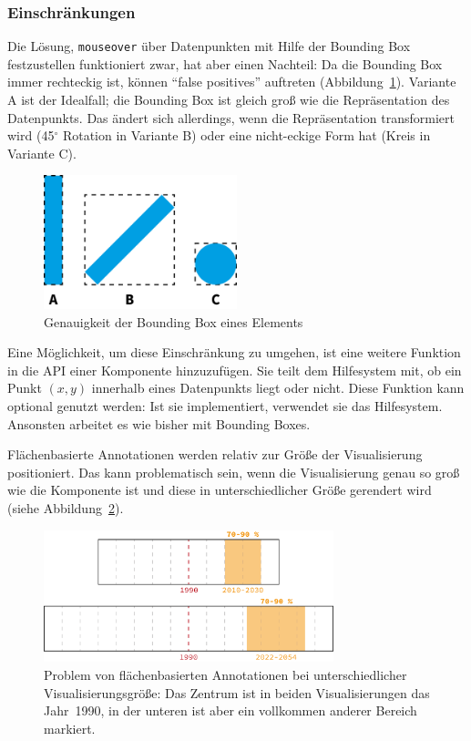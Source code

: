 \documentclass[
	headsepline,
	footsepline,
	fontsize=12pt,
	bibliography=totoc
]{scrbook}
\begin{document}
\subsubsection{Einschränkungen}

Die Lösung, \texttt{mouseover} über Datenpunkten mit Hilfe der Bounding Box festzustellen funktioniert zwar, hat aber einen Nachteil: Da die Bounding Box immer rechteckig ist, können \enquote{false positives} auftreten (Abbildung~\ref{figure:kommentar-bbox}). Variante A ist der Idealfall; die Bounding Box ist gleich groß wie die Repräsentation des Datenpunkts. Das ändert sich allerdings, wenn die Repräsentation transformiert wird (45$^\circ$ Rotation in Variante B) oder eine nicht-eckige Form hat (Kreis in Variante C).

\begin{figure}[htbp]
   \centering
   \includegraphics[width=0.5\textwidth]{images/implementierung-kommentar-bbox.png}
   \caption{Genauigkeit der Bounding Box eines Elements}
   \label{figure:kommentar-bbox}
\end{figure}

Eine Möglichkeit, um diese Einschränkung zu umgehen, ist eine weitere Funktion in die API einer Komponente hinzuzufügen. Sie teilt dem Hilfesystem mit, ob ein Punkt $(x,y)$ innerhalb eines Datenpunkts liegt oder nicht. Diese Funktion kann optional genutzt werden: Ist sie implementiert, verwendet sie das Hilfesystem. Ansonsten arbeitet es wie bisher mit Bounding Boxes.

Flächenbasierte Annotationen werden relativ zur Größe der Visualisierung positioniert. Das kann problematisch sein, wenn die Visualisierung genau so groß wie die Komponente ist und diese in unterschiedlicher Größe gerendert wird (siehe Abbildung~\ref{figure:area-anno}).

\begin{figure}[htbp]
   \centering
   \includegraphics[width=0.75\textwidth]{images/implementierung-area-anno.png}
   \caption{Problem von flächenbasierten Annotationen bei unterschiedlicher Visualisierungsgröße: Das Zentrum ist in beiden Visualisierungen das Jahr~1990, in der unteren ist aber ein vollkommen anderer Bereich markiert.}
   \label{figure:area-anno}
\end{figure}
\end{document}
